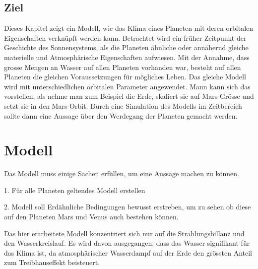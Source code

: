 \begin{refsection}
\subsection{Ziel}
Dieses Kapitel zeigt ein Modell, wie das Klima eines Planeten mit deren orbitalen Eigenschaften verknüpft werden kann.
Betrachtet wird ein früher Zeitpunkt der Geschichte des Sonnensystems, als die Planeten ähnliche oder annähernd gleiche materielle und Atmosphärische Eigenschaften aufwiesen.
Mit der Annahme, dass grosse Mengen an Wasser auf allen Planeten vorhanden war, besteht auf allen Planeten die gleichen Voraussetzungen für mögliches Leben.
Das gleiche Modell wird mit unterschiedlichen orbitalen Parameter angewendet. Mann kann sich das vorstellen, als nehme man zum Beispiel die Erde, skaliert sie auf Mars-Grösse und setzt sie in den Mars-Orbit. 
Durch eine Simulation des Modells im Zeitbereich sollte dann eine Aussage über den Werdegang der Planeten gemacht werden.




%
%
%

\section{Modell}


	Das Modell muss einige Sachen erfüllen, um eine Aussage machen zu können.

	1. Für alle Planeten geltendes Modell erstellen
	
	2. Modell soll Erdähnliche Bedingungen bewusst erstreben, um zu sehen ob diese auf den Planeten Mars und Venus auch bestehen können.
	
	
	Das hier erarbeitete Modell konzentriert sich nur auf die Strahlungsbillanz und den Wasserkreislauf. Es wird davon ausgegangen, dass das Wasser signifikant für das Klima ist, da atmosphärischer Wasserdampf auf der Erde den grössten Anteil zum Treibhauseffekt beisteuert.
	

\end{refsection}
